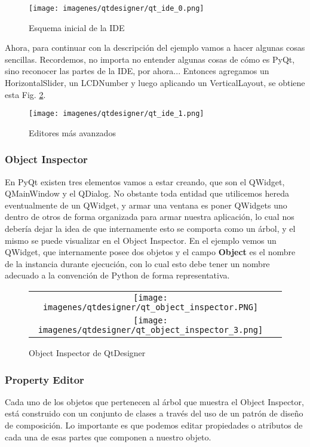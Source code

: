 \begin{figure}[H]
    \centering
    \texttt{[image: imagenes/qtdesigner/qt\_ide\_0.png]}
    \caption{Esquema inicial de la IDE}
    \label{fig:qt_ide_0}
\end{figure}

Ahora, para continuar con la descripci\'on del ejemplo vamos a hacer algunas cosas sencillas. Recordemos,
no importa no entender algunas cosas de c\'omo es PyQt, sino reconocer las partes de la IDE, por ahora...
Entonces agregamos un HorizontalSlider, un LCDNumber y luego aplicando un VerticalLayout, se obtiene esta Fig. \ref{fig:qt_ide_1}.

\begin{figure}[H]
    \centering
    \texttt{[image: imagenes/qtdesigner/qt\_ide\_1.png]}
    \caption{Editores m\'as avanzados}
    \label{fig:qt_ide_1}
\end{figure}

\subsubsection{Object Inspector}
En PyQt existen tres elementos vamos a estar creando, que son el QWidget, QMainWindow y el QDialog. No obstante toda entidad que utilicemos hereda eventualmente
de un QWidget, y armar una ventana es poner QWidgets uno dentro de otros de forma organizada para armar nuestra aplicaci\'on, lo cual nos deber\'ia dejar la idea
de que internamente esto se comporta como un \'arbol, y el mismo se puede visualizar en el Object Inspector.
En el ejemplo vemos un QWidget, que internamente posee dos objetos y el campo \textbf{Object} es el nombre de la instancia durante ejecuci\'on,
con lo cual esto debe tener un nombre adecuado a la convenci\'on de Python de forma representativa.

\begin{figure}[H]
    \centering
    \begin{tabular}{c c}
        \texttt{[image: imagenes/qtdesigner/qt\_object\_inspector.PNG]} \\
        \texttt{[image: imagenes/qtdesigner/qt\_object\_inspector\_3.png]}
    \end{tabular}
    \caption{Object Inspector de QtDesigner}
    \label{fig:qt_object_inspector}
\end{figure}

\subsubsection{Property Editor}
Cada uno de los objetos que pertenecen al \'arbol que muestra el Object Inspector, est\'a construido con un conjunto de clases a trav\'es del uso de un 
patr\'on de dise\~no de composici\'on. Lo importante es que podemos editar propiedades o atributos de cada una de esas partes que componen a nuestro objeto.

